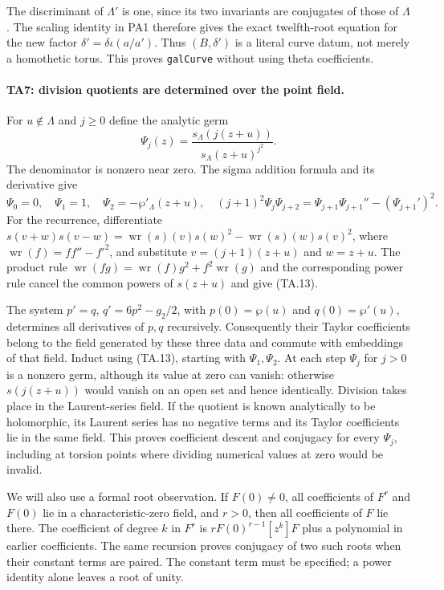 The discriminant of $\Lambda'$ is one, since its two invariants
are conjugates of those of $\Lambda$. The scaling identity in
PA1 therefore gives the exact twelfth-root equation for the
new factor $\delta'=\delta\iota(a/a')$. Thus $(B,\delta')$
is a literal curve datum, not merely a homothetic torus.
This proves \texttt{galCurve} without using theta coefficients.

\paragraph{TA7: division quotients are determined over the point field.}
For $u\notin\Lambda$ and $j\ge0$ define the analytic germ
\[
 \Psi_j(z)=\frac{s_\Lambda(j(z+u))}
                 {s_\Lambda(z+u)^{j^2}}.                    \tag{TA.12}
\]
The denominator is nonzero near zero. The sigma addition
formula and its derivative give
\[
 \Psi_0=0,\quad\Psi_1=1,\quad
 \Psi_2=-\wp'_\Lambda(z+u),\quad
 (j+1)^2\Psi_j\Psi_{j+2}
       =\Psi_{j+1}\Psi_{j+1}''-(\Psi_{j+1}')^2.              \tag{TA.13}
\]
For the recurrence, differentiate
$s(v+w)s(v-w)=\operatorname{wr}(s)(v)s(w)^2
-\operatorname{wr}(s)(w)s(v)^2$, where
$\operatorname{wr}(f)=ff''-f'^2$, and substitute
$v=(j+1)(z+u)$ and $w=z+u$. The product rule
$\operatorname{wr}(fg)=\operatorname{wr}(f)g^2+f^2\operatorname{wr}(g)$
and the corresponding power rule cancel the common powers
of $s(z+u)$ and give (TA.13).

The system $p'=q$, $q'=6p^2-g_2/2$, with
$p(0)=\wp(u)$ and $q(0)=\wp'(u)$, determines all derivatives
of $p,q$ recursively. Consequently their Taylor coefficients
belong to the field generated by these three data and commute
with embeddings of that field. Induct using (TA.13), starting
with $\Psi_1,\Psi_2$. At each step $\Psi_j$ for $j>0$ is a
nonzero germ, although its value at zero can vanish: otherwise
$s(j(z+u))$ would vanish on an open set and hence identically.
Division takes place in the Laurent-series field. If the
quotient is known analytically to be holomorphic, its Laurent
series has no negative terms and its Taylor coefficients lie
in the same field. This proves coefficient descent and
conjugacy for every $\Psi_j$, including at torsion points
where dividing numerical values at zero would be invalid.

We will also use a formal root observation. If $F(0)\ne0$,
all coefficients of $F^r$ and $F(0)$ lie in a characteristic-zero
field, and $r>0$, then all coefficients of $F$ lie there.
The coefficient of degree $k$ in $F^r$ is
$rF(0)^{r-1}[z^k]F$ plus a polynomial in earlier coefficients.
The same recursion proves conjugacy of two such roots when
their constant terms are paired. The constant term must be
specified; a power identity alone leaves a root of unity.

